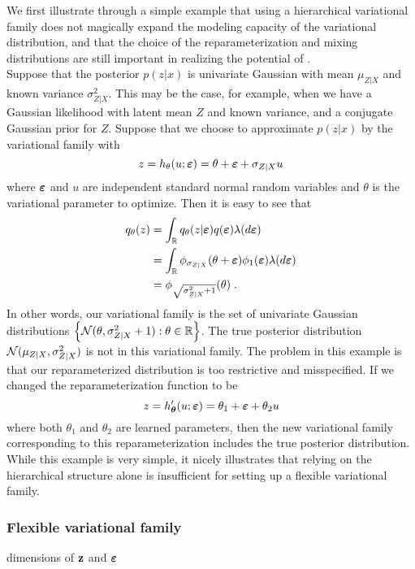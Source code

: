 \documentclass[10pt]{article}
\begin{document}
We first illustrate through a simple example that using a hierarchical variational family does not magically expand the modeling capacity of the variational distribution, and that the choice of the reparameterization and mixing distributions are still important in realizing the potential of \uivi.
\\

Suppose that the posterior $p(z|x)$ is univariate Gaussian with mean $\mu_{Z|X}$ and known variance $\sigma_{Z|X}^2$. This may be the case, for example, when we have a Gaussian likelihood with latent mean $Z$ and known variance, and a conjugate Gaussian prior for $Z$. Suppose that we choose to approximate $p(z|x)$ by the \uivi variational family with
\[
z = h_\theta(u;\bm{\varepsilon}) = \theta + \bm{\varepsilon} + \sigma_{Z|X}u
\]
where $\bm{\varepsilon}$ and $u$ are independent standard normal random variables and $\theta$ is the variational parameter to optimize. Then it is easy to see that
\begin{align*}
q_\theta(z) &= \int_{\mathbb{R}} q_\theta(z|\bm{\varepsilon})q(\bm{\varepsilon})\lambda(d\bm{\varepsilon}) \\
&= \int_{\mathbb{R}} \phi_{\sigma_{Z|X}}(\theta+\bm{\varepsilon})\phi_1(\bm{\varepsilon}) \lambda(d\bm{\varepsilon}) \\
&= \phi_{\sqrt{\sigma_{Z|X}^2+1}}(\theta) \;.
\end{align*}
In other words, our variational family is the set of univariate Gaussian distributions $\left\{\mathcal{N}(\theta,\sigma_{Z|X}^2+1):\theta\in\mathbb{R}\right\}$. The true posterior distribution $\mathcal{N}(\mu_{Z|X},\sigma_{Z|X}^2)$ is not in this variational family. The problem in this example is that our reparameterized distribution is too restrictive and misspecified. If we changed the reparameterization function to be
\[
z = h_{\bm{\theta}}'(u;\bm{\varepsilon}) = \theta_1 + \bm{\varepsilon} + \theta_2u
\]
where both $\theta_1$ and $\theta_2$ are learned parameters, then the new variational family corresponding to this reparameterization includes the true posterior distribution. While this example is very simple, it nicely illustrates that relying on the hierarchical structure alone is insufficient for setting up a flexible variational family.


\subsubsection{Flexible variational family}

\todo dimensions of $\mathbf{z}$ and $\bm{\varepsilon}$
\end{document}
